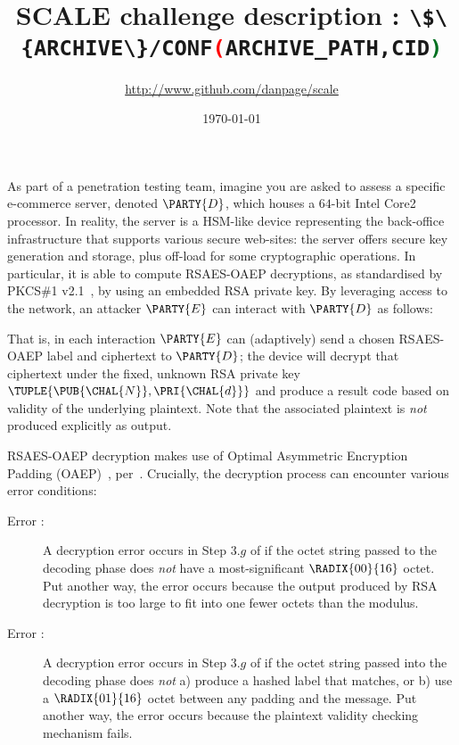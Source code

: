 \documentclass[crop={false},multi={true},tikz={true}]{standalone}
\begin{document}

\ifstandalone
\author{\url{http://www.github.com/danpage/scale}}
\title{\Large SCALE challenge description : \lstinline[language={bash}]|\$\{ARCHIVE\}/CONF(ARCHIVE_PATH,CID)|}
\date{\today}

\maketitle
\fi



As part of a penetration testing team, imagine you are asked to assess a 
specific e-commerce server, denoted $\PARTY{D}$, which houses a $64$-bit
Intel Core2 processor.  
In reality, the server is a HSM-like device representing the back-office 
infrastructure that supports various secure web-sites: the server offers
secure key generation and storage, plus off-load for some cryptographic 
operations.  In particular, it is able to compute RSAES-OAEP decryptions, 
as standardised by PKCS\#1 v2.1~\cite{SCALE:RFC:3447}, by using an 
embedded RSA private key.
By leveraging access to the network, 
an attacker $\PARTY{E}$ can interact with $\PARTY{D}$ as follows:

\begin{center}

\end{center}

\noindent
That is, in each interaction $\PARTY{E}$ can (adaptively) send 
a chosen RSAES-OAEP label and ciphertext
to $\PARTY{D}$; the device will
decrypt that ciphertext under the fixed, unknown RSA private key $\TUPLE{ \PUB{\CHAL{N}}, \PRI{\CHAL{d}} }$ 
and produce 
a result code based on validity of the underlying  plaintext.
Note that the associated  plaintext is {\em not} produced explicitly as
output.

RSAES-OAEP decryption makes use of Optimal Asymmetric Encryption Padding 
(OAEP)~\cite{SCALE:BelRog:94}, per~\cite[Section 7.1]{SCALE:RFC:3447}.  
Crucially, the decryption process can encounter various error conditions:

\begin{description}
\item[Error :]
     A decryption error occurs in Step $3.g$ of  
     if the octet string passed to the decoding phase
     does {\em not} have a most-significant $\RADIX{00}{16}$ octet.
     Put another way, the error occurs because 
     the output produced by RSA decryption is too large to fit into one 
     fewer octets than the modulus.

\item[Error :]
     A decryption error occurs in Step $3.g$ of  
     if the octet string passed into the decoding phase 
     does {\em not} a) produce a hashed label that matches, or b) use a
     $\RADIX{01}{16}$ octet between any padding and the message.
     Put another way, the error occurs because 
     the plaintext validity checking mechanism fails.
\end{description}
\end{document}
